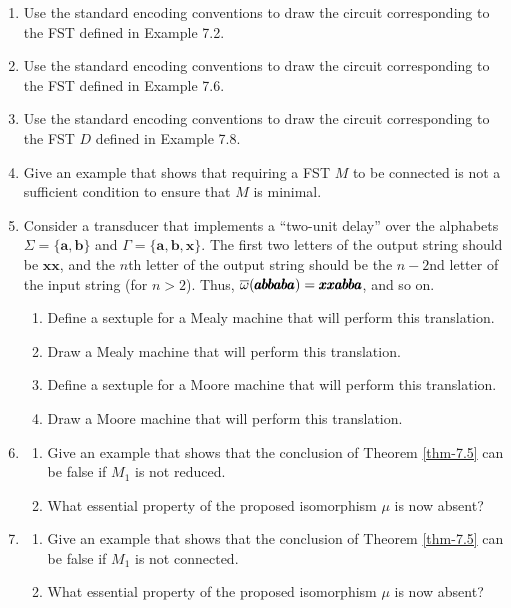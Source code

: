 \begin{enumerate}[{7.}1.]
\item Use the standard encoding conventions to draw the circuit corresponding
to the FST defined in Example 7.2.

\item Use the standard encoding conventions to draw the circuit corresponding
to the FST defined in Example 7.6.

\item Use the standard encoding conventions to draw the circuit corresponding
to the FST $D$ defined in Example 7.8.

\item Give an example that shows that requiring a FST $M$ to be connected is not
a sufficient condition to ensure that $M$ is minimal.

\item Consider a transducer that implements a ``two-unit delay'' over the
alphabets $\Sigma=\{\pmb{a},\pmb{b}\}$ and $\Gamma=\{\pmb{a},\pmb{b},\pmb{x}\}$.
The first two letters of the output string should be $\pmb{xx}$, and the $n$th
letter of the output string should be the $n-2$nd letter of the input string
(for $n > 2$). Thus, $\overline{\omega}(\pmb{abbaba})=\pmb{xxabba}$, and so on.
\begin{enumerate}
\item Define a sextuple for a Mealy machine that will perform this translation.
\item Draw a Mealy machine that will perform this translation.
\item Define a sextuple for a Moore machine that will perform this translation.
\item Draw a Moore machine that will perform this translation.
\end{enumerate}

\item \begin{enumerate}
\item Give an example that shows that the conclusion of Theorem \ref{thm-7.5} can be
false if $M_1$ is not reduced.
\item What essential property of the proposed isomorphism $\mu$ is now absent?
\end{enumerate}

\item \begin{enumerate}
\item Give an example that shows that the conclusion of Theorem \ref{thm-7.5} can be
false if $M_1$ is not connected.
\item What essential property of the proposed isomorphism $\mu$ is now absent?
\end{enumerate}


\end{enumerate}
